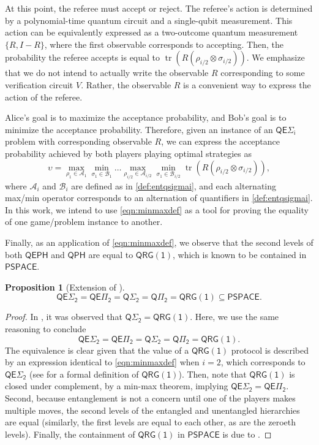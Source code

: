 \documentclass[11pt]{article}
\newtheorem{proposition}[theorem]{Proposition}
\theoremstyle{definition}
\DeclareMathOperator{\tr}{tr}
\newcommand{\class}[1]{\ensuremath{\mathsf{#1}}\xspace}
\newcommand{\PSPACE}{\class{PSPACE}}
\newcommand{\QRGk}[1][k]{\class{QRG(#1)}}
\newcommand{\QRGone}{\QRGk[1]}
\newcommand{\QPH}{\class{QPH}}
\newcommand{\QSigmai}[1][i]{\class{Q\Sigma_{#1}}}
\newcommand{\QPii}[1][i]{\class{Q\Pi_{#1}}}
\newcommand{\QEPH}{\class{QEPH}}
\newcommand{\entQSigmai}[1][i]{\class{QE\Sigma_{#1}}}
\newcommand{\entQPii}[1][i]{\class{QE\Pi_{#1}}}
\newcommand{\calA}{\mathcal{A}}
\newcommand{\calB}{\mathcal{B}}
\begin{document}
At this point, the referee must accept or reject. 
The referee's action is determined by a polynomial-time quantum circuit and a single-qubit measurement. This action can be equivalently expressed as a two-outcome quantum measurement $\{R, I-R\}$, where the first observable corresponds to accepting. Then, the probability the referee accepts is equal to $\tr\left(R \left(\rho_{i/2} \otimes \sigma_{i/2} \right) \right)$. 
We emphasize that we do not intend to actually write the observable $R$ corresponding to some verification circuit $V$. Rather, the observable $R$ is a convenient way to express the action of the referee. 

Alice's goal is to maximize the acceptance probability, and Bob's goal is to minimize the acceptance probability. 
Therefore, given an instance of an $\entQSigmai[i]$ problem with corresponding observable $R$, 
we can express the acceptance probability achieved by both players playing optimal strategies as
\begin{equation}\label{eqn:minmaxdef}
    \upsilon = \max_{\rho_1 \in \calA_1} \min_{\sigma_1 \in \calB_1} \ldots \max_{\rho_{i/2} \in \calA_{i/2}} \min_{\sigma_1 \in \calB_{i/2}} \tr\left(R \left(\rho_{i/2} \otimes \sigma_{i/2}\right) \right),   
\end{equation}
where $\calA_i$ and $\calB_i$ are defined as in \cref{def:entqsigmai}, and each alternating max/min operator corresponds to an alternation of quantifiers in \cref{def:entqsigmai}.
In this work, we intend to use \cref{eqn:minmaxdef} as a tool for proving the equality of one game/problem instance to another.



Finally, as an application of \cref{eqn:minmaxdef}, we observe that the second levels of both $\QEPH$ and $\QPH$ are equal to $\QRGone$, which is known to be contained in $\PSPACE$.

\begin{proposition}[Extension of {\cite[Corollary 1.9]{GSSSY22_qph}}]\label{prop:second-levels-equal}
    \[
    \entQSigmai[2] = \entQPii[2] = \QSigmai[2] = \QPii[2] = \QRGone \subseteq \PSPACE.
    \]
\end{proposition}
\begin{proof}
    In \cite{GSSSY22_qph}, it was observed that $\QSigmai[2] = \QRGone$.
    Here, we use the same reasoning to conclude
    \[
        \entQSigmai[2] = \entQPii[2] = \QSigmai[2] = \QPii[2] = \QRGone .
    \]
    The equivalence is clear given that the value of a $\QRGone$ protocol is described by an expression identical to \cref{eqn:minmaxdef} when $i=2$, which corresponds to $\entQSigmai[2]$ (see \cite{jain2009parallel} for a formal definition of $\QRGone$).
    Then, note that $\QRGone$ is closed under complement, by a min-max theorem, implying $\entQSigmai[2]=\entQPii[2]$.
    Second, because entanglement is not a concern until one of the players makes multiple moves, the second levels of the entangled and unentangled hierarchies are equal (similarly, the first levels are equal to each other, as are the zeroeth levels).
    Finally, the containment of $\QRGone$ in $\PSPACE$ is due to \cite[Proposition 4]{jain2009parallel}.
\end{proof}
\end{document}
